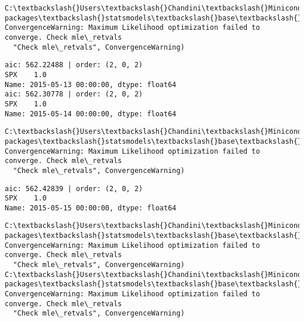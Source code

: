 \documentclass[11pt]{article}
\begin{document}
    \begin{Verbatim}[commandchars=\\\{\}]
C:\textbackslash{}Users\textbackslash{}Chandini\textbackslash{}Miniconda3\textbackslash{}envs\textbackslash{}auquan\textbackslash{}lib\textbackslash{}site-packages\textbackslash{}statsmodels\textbackslash{}base\textbackslash{}model.py:496: ConvergenceWarning: Maximum Likelihood optimization failed to converge. Check mle\_retvals
  "Check mle\_retvals", ConvergenceWarning)

    \end{Verbatim}

    \begin{Verbatim}[commandchars=\\\{\}]
aic: 562.22488 | order: (2, 0, 2)
SPX    1.0
Name: 2015-05-13 00:00:00, dtype: float64
aic: 562.30778 | order: (2, 0, 2)
SPX    1.0
Name: 2015-05-14 00:00:00, dtype: float64

    \end{Verbatim}

    \begin{Verbatim}[commandchars=\\\{\}]
C:\textbackslash{}Users\textbackslash{}Chandini\textbackslash{}Miniconda3\textbackslash{}envs\textbackslash{}auquan\textbackslash{}lib\textbackslash{}site-packages\textbackslash{}statsmodels\textbackslash{}base\textbackslash{}model.py:496: ConvergenceWarning: Maximum Likelihood optimization failed to converge. Check mle\_retvals
  "Check mle\_retvals", ConvergenceWarning)

    \end{Verbatim}

    \begin{Verbatim}[commandchars=\\\{\}]
aic: 562.42839 | order: (2, 0, 2)
SPX    1.0
Name: 2015-05-15 00:00:00, dtype: float64

    \end{Verbatim}

    \begin{Verbatim}[commandchars=\\\{\}]
C:\textbackslash{}Users\textbackslash{}Chandini\textbackslash{}Miniconda3\textbackslash{}envs\textbackslash{}auquan\textbackslash{}lib\textbackslash{}site-packages\textbackslash{}statsmodels\textbackslash{}base\textbackslash{}model.py:496: ConvergenceWarning: Maximum Likelihood optimization failed to converge. Check mle\_retvals
  "Check mle\_retvals", ConvergenceWarning)
C:\textbackslash{}Users\textbackslash{}Chandini\textbackslash{}Miniconda3\textbackslash{}envs\textbackslash{}auquan\textbackslash{}lib\textbackslash{}site-packages\textbackslash{}statsmodels\textbackslash{}base\textbackslash{}model.py:496: ConvergenceWarning: Maximum Likelihood optimization failed to converge. Check mle\_retvals
  "Check mle\_retvals", ConvergenceWarning)

    \end{Verbatim}
\end{document}
